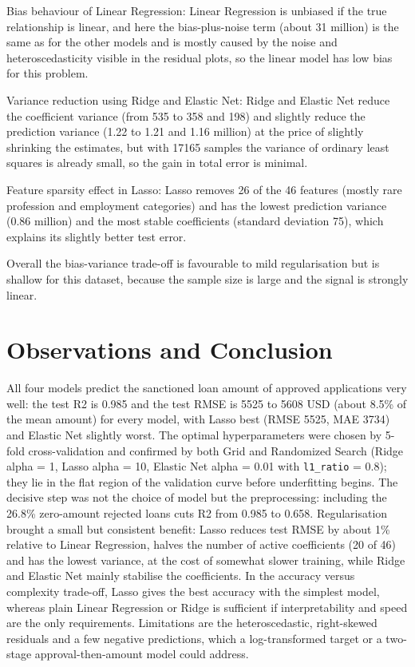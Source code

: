 \documentclass[11pt]{article}
\begin{document}
Bias behaviour of Linear Regression: Linear Regression is unbiased if the true relationship
is linear, and here the bias-plus-noise term (about 31 million) is the same as for the other
models and is mostly caused by the noise and heteroscedasticity visible in the residual
plots, so the linear model has low bias for this problem.

Variance reduction using Ridge and Elastic Net: Ridge and Elastic Net reduce the coefficient
variance (from 535 to 358 and 198) and slightly reduce the prediction variance (1.22 to 1.21
and 1.16 million) at the price of slightly shrinking the estimates, but with 17165 samples
the variance of ordinary least squares is already small, so the gain in total error is
minimal.

Feature sparsity effect in Lasso: Lasso removes 26 of the 46 features (mostly rare
profession and employment categories) and has the lowest prediction variance (0.86 million)
and the most stable coefficients (standard deviation 75), which explains its slightly better
test error.

Overall the bias-variance trade-off is favourable to mild regularisation but is shallow for
this dataset, because the sample size is large and the signal is strongly linear.

\section*{Observations and Conclusion}
\label{sec:orgfafe0c3}


All four models predict the sanctioned loan amount of approved applications very well: the
test R2 is 0.985 and the test RMSE is 5525 to 5608 USD (about 8.5\% of the mean amount) for
every model, with Lasso best (RMSE 5525, MAE 3734) and Elastic Net slightly worst. The
optimal hyperparameters were chosen by 5-fold cross-validation and confirmed by both Grid
and Randomized Search (Ridge alpha = 1, Lasso alpha = 10, Elastic Net alpha = 0.01 with
\texttt{l1\_ratio} = 0.8); they lie in the flat region of the validation curve before underfitting
begins. The decisive step was not the choice of model but the preprocessing: including the
26.8\% zero-amount rejected loans cuts R2 from 0.985 to 0.658. Regularisation brought a small
but consistent benefit: Lasso reduces test RMSE by about 1\% relative to Linear Regression,
halves the number of active coefficients (20 of 46) and has the lowest variance, at the cost
of somewhat slower training, while Ridge and Elastic Net mainly stabilise the coefficients.
In the accuracy versus complexity trade-off, Lasso gives the best accuracy with the simplest
model, whereas plain Linear Regression or Ridge is sufficient if interpretability and speed
are the only requirements. Limitations are the heteroscedastic, right-skewed residuals and a
few negative predictions, which a log-transformed target or a two-stage approval-then-amount
model could address.
\end{document}
